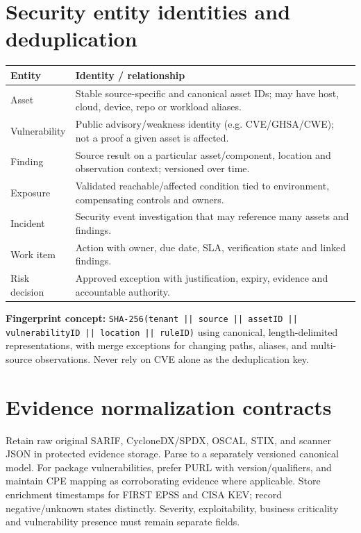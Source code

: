 \documentclass[11pt,oneside]{report}
\begin{document}
\section{Security entity identities and deduplication}

\noindent\begin{tabularx}{\textwidth}{P{0.19\textwidth}Y}
\toprule Entity & Identity / relationship\\\midrule
Asset & Stable source-specific and canonical asset IDs; may have host, cloud, device, repo or workload aliases.\\
Vulnerability & Public advisory/weakness identity (e.g. CVE/GHSA/CWE); not a proof a given asset is affected.\\
Finding & Source result on a particular asset/component, location and observation context; versioned over time.\\
Exposure & Validated reachable/affected condition tied to environment, compensating controls and owners.\\
Incident & Security event investigation that may reference many assets and findings.\\
Work item & Action with owner, due date, SLA, verification state and linked findings.\\
Risk decision & Approved exception with justification, expiry, evidence and accountable authority.\\
\bottomrule
\end{tabularx}
\textbf{Fingerprint concept:} \texttt{SHA-256(tenant || source || assetID || vulnerabilityID || location || ruleID)} using canonical, length-delimited representations, with merge exceptions for changing paths, aliases, and multi-source observations. Never rely on CVE alone as the deduplication key.

\section{Evidence normalization contracts}
Retain raw original SARIF, CycloneDX/SPDX, OSCAL, STIX, and scanner JSON in protected evidence storage. Parse to a separately versioned canonical model. For package vulnerabilities, prefer PURL with version/qualifiers, and maintain CPE mapping as corroborating evidence where applicable. Store enrichment timestamps for FIRST EPSS and CISA KEV; record negative/unknown states distinctly. Severity, exploitability, business criticality and vulnerability presence must remain separate fields.
\end{document}
